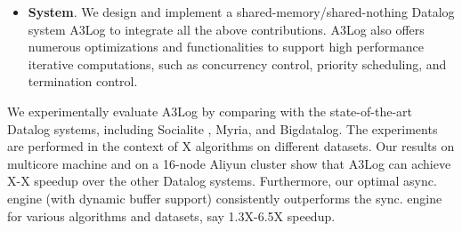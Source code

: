 \begin{itemize}
	\item \textbf{System}. We design and implement a shared-memory/shared-nothing Datalog system A3Log to integrate all the above contributions. A3Log also offers numerous optimizations and functionalities to support high performance iterative computations, such as concurrency control, priority scheduling, and termination control.

	
\end{itemize}

We experimentally evaluate A3Log by comparing with the state-of-the-art Datalog systems, including Socialite\cite{Lam:2013:SDE:2510649.2511289} , Myria\cite{Wang:2015:AFR:2824032.2824052}, and Bigdatalog\cite{Shkapsky:2016:BDA:2882903.2915229}. The experiments are performed in the context of X algorithms on different datasets. Our results on multicore machine and on a 16-node Aliyun cluster show that A3Log can achieve X-X speedup over the other Datalog systems. Furthermore, our optimal async. engine (with dynamic buffer support) consistently outperforms the sync. engine for various algorithms and datasets, say 1.3X-6.5X speedup.

